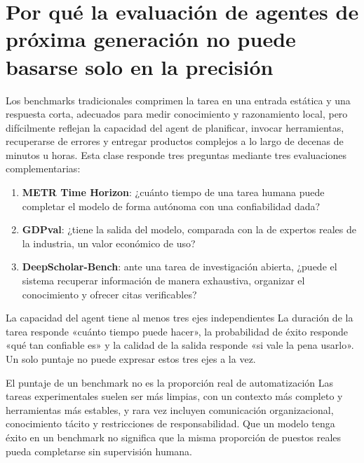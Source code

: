 \documentclass[a4paper]{article}
\begin{document}
\makelecturetitle

\section{Por qué la evaluación de agentes de próxima generación no puede basarse solo en la precisión}

Los benchmarks tradicionales comprimen la tarea en una entrada estática y una respuesta corta, adecuados para medir conocimiento y razonamiento local, pero difícilmente reflejan la capacidad del agent de planificar, invocar herramientas, recuperarse de errores y entregar productos complejos a lo largo de decenas de minutos u horas. Esta clase responde tres preguntas mediante tres evaluaciones complementarias:

\begin{enumerate}
    \item \textbf{METR Time Horizon}: ¿cuánto tiempo de una tarea humana puede completar el modelo de forma autónoma con una confiabilidad dada?
    \item \textbf{GDPval}: ¿tiene la salida del modelo, comparada con la de expertos reales de la industria, un valor económico de uso?
    \item \textbf{DeepScholar-Bench}: ante una tarea de investigación abierta, ¿puede el sistema recuperar información de manera exhaustiva, organizar el conocimiento y ofrecer citas verificables?
\end{enumerate}


\begin{importantbox}{La capacidad del agent tiene al menos tres ejes independientes}
La duración de la tarea responde «cuánto tiempo puede hacer», la probabilidad de éxito responde «qué tan confiable es» y la calidad de la salida responde «si vale la pena usarlo». Un solo puntaje no puede expresar estos tres ejes a la vez.
\end{importantbox}

\begin{warningbox}{El puntaje de un benchmark no es la proporción real de automatización}
Las tareas experimentales suelen ser más limpias, con un contexto más completo y herramientas más estables, y rara vez incluyen comunicación organizacional, conocimiento tácito y restricciones de responsabilidad. Que un modelo tenga éxito en un benchmark no significa que la misma proporción de puestos reales pueda completarse sin supervisión humana.
\end{warningbox}
\end{document}
